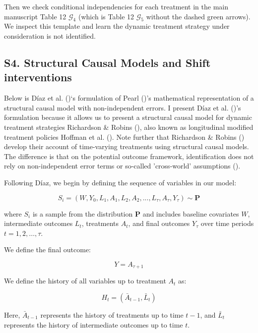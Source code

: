 \documentclass[
  single column]{article}
\begin{document}
Then we check conditional independencies for each treatment in the main
manuscript Table 12 \(\mathcal{G}_4\) (which is Table 12
\(\mathcal{G}_5\) without the dashed green arrows). We inspect this
template and learn the dynamic treatment strategy under consideration is
not identified.

\newpage{}

\subsection{S4. Structural Causal Models and Shift
interventions}\label{s4.-structural-causal-models-and-shift-interventions}

Below is Díaz et al. ()`s formulation of
Pearl ()'s mathematical representation of
a structural causal model with non-independent errors. I present Díaz et
al. ()'s formulation because it allows
us to present a structural causal model for dynamic treatment strategies
Richardson \& Robins (), also known
as longitudinal modified treatment policies Hoffman et al.
(). Note further that Richardson \&
Robins () develop their account of
time-varying treatments using structural causal models. The difference
is that on the potential outcome framework, identification does not rely
on non-independent error terms or so-called 'cross-world' assumptions
().

Following Díaz, we begin by defining the sequence of variables in our
model:

\[
S_i= (W, Y_0, L_1, A_1, L_2, A_2, ..., L_\tau, A_\tau, Y_{\tau}) \sim \mathbf{P}
\]

where \(S_i\) is a sample from the distribution \(\mathbf{P}\) and
includes baseline covariates \(W\), intermediate outcomes \(L_t\),
treatments \(A_t\), and final outcomes \(Y_{\tau}\) over time periods
\(t = 1, 2, \ldots, \tau\).

We define the final outcome:

\[
Y = A_{\tau + 1}
\]

We define the history of all variables up to treatment \(A_t\) as:

\[
H_t = (\bar{A}_{t-1}, \bar{L}_t)
\]

Here, \(\bar{A}_{t-1}\) represents the history of treatments up to time
\(t-1\), and \(\bar{L}_t\) represents the history of intermediate
outcomes up to time \(t\).
\end{document}
